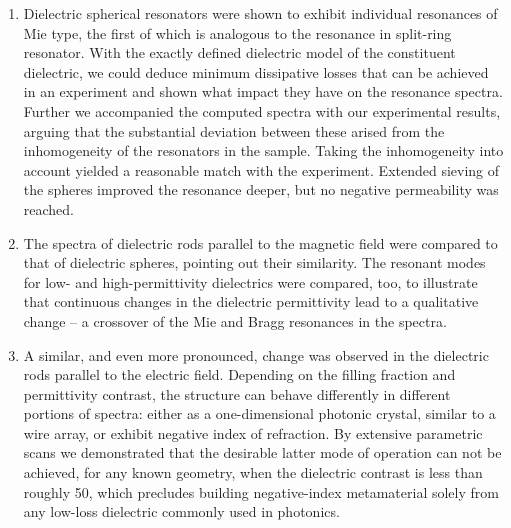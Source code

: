 \begin{enumerate}
{} 
\item{Dielectric spherical resonators were shown to exhibit individual resonances of Mie type, the first of which is analogous to the resonance in split-ring resonator. With the exactly defined dielectric model of the constituent dielectric, we could deduce minimum dissipative losses that can be achieved in an experiment and shown what impact they have on the resonance spectra. Further we accompanied the computed spectra with our experimental results, arguing that the substantial deviation between these arised from the inhomogeneity of the resonators in the sample. Taking the inhomogeneity into account yielded a reasonable match with the experiment. Extended sieving of the spheres improved the resonance deeper, but no negative permeability was reached.
} 
\item{The spectra of dielectric rods parallel to the magnetic field were compared to that of dielectric spheres, pointing out their similarity. The resonant modes for low- and high-permittivity dielectrics were compared, too, to illustrate that continuous changes in the dielectric permittivity lead to a qualitative change -- a crossover of the Mie and Bragg resonances in the spectra.
} 
\item{A similar, and even more pronounced, change was observed in the dielectric rods parallel to the electric field. Depending on the filling fraction and permittivity contrast, the structure can behave differently in different portions of spectra: either as a one-dimensional photonic crystal, similar to a wire array, or exhibit negative index of refraction. By extensive parametric scans we demonstrated that the desirable latter mode of operation  can not be achieved, for any known geometry, when the dielectric contrast is less than roughly 50, which precludes building negative-index metamaterial solely from any low-loss dielectric commonly used in photonics. 
}
\end{enumerate}
